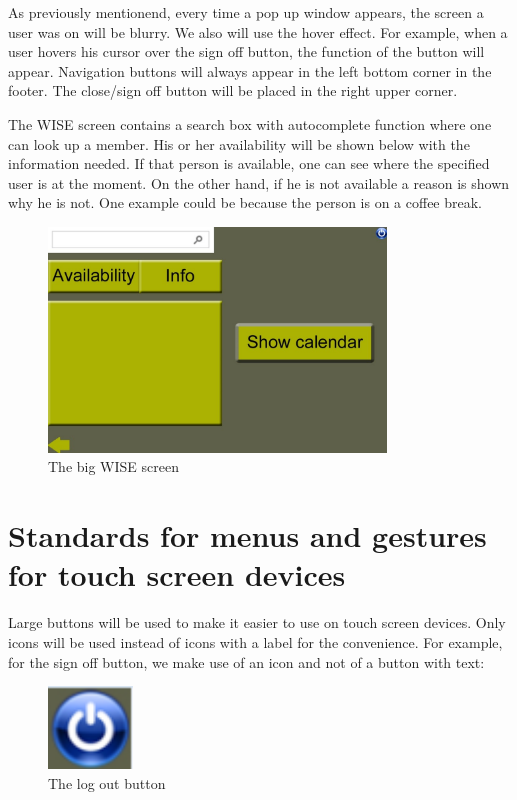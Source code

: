 \documentclass[11pt, a4paper,svglistings]{report}
\begin{document}
As previously mentionend, every time a pop up window appears, the screen a user was on will be blurry.
We also will use the hover effect. For example, when a user hovers his cursor over the sign off button, the function of the button will appear.
Navigation buttons will always appear in the left bottom corner in the footer. The close/sign off button will be placed in the right upper corner.

The WISE screen contains a search box with autocomplete function where one can look up a member. His or her availability will be shown below with the information needed. If that person is available, one can see where the specified user is at the moment. On the other hand, if he is not available a reason is shown why he is not. One example could be because the person is on a coffee break.

\begin{figure}[H]
\centering
    \includegraphics[width=0.8\textwidth]{Wise.jpg}
  \caption[WISE screen]{The big WISE screen}
\end{figure}

\section{Standards for menus and gestures for touch screen devices}

Large buttons will be used to make it easier to use on touch screen devices. Only icons will be used instead of icons with a label for the convenience.
For example, for the sign off button, we make use of an icon and not of a button with text: 

\begin{figure}[H]
\centering
    \includegraphics[width=0.2\textwidth]{SignOff.png}
  \caption[Log off button]{The log out button}
\end{figure}
\end{document}
